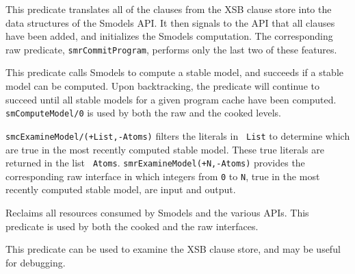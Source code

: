 \begin{description}

%
This predicate translates all of the clauses from the XSB clause store
into the data structures of the Smodels API.  It then signals to the
API that all clauses have been added, and initializes the Smodels
computation.  The corresponding raw predicate, {\tt smrCommitProgram},
performs only the last two of these features.

%
This predicate calls Smodels to compute a stable model, and succeeds
if a stable model can be computed.  Upon backtracking, the predicate
will continue to succeed until all stable models for a given program
cache have been computed.  {\tt smComputeModel/0} is used by both the
raw and the cooked levels.


%
{\tt smcExamineModel/(+List,-Atoms)} filters the literals in {\tt
  List} to determine which are true in the most recently computed
stable model.  These true literals are returned in the list {\tt
  Atoms}.  {\tt smrExamineModel(+N,-Atoms)} provides the corresponding
raw interface in which integers from {\tt 0} to {\tt N}, true in the
most recently computed stable model, are input and output.


%
Reclaims all resources consumed by Smodels and the various APIs.  This
predicate is used by both the cooked and the raw interfaces.


%
This predicate can be used to examine the XSB clause store, and may
be useful for debugging.

\end{description}

